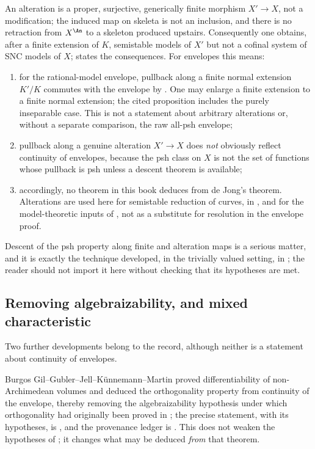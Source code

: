 An alteration is a proper, surjective, generically finite morphism
\(X'\to X\), not a modification; the induced map on skeleta is not an
inclusion, and there is no retraction from \(X^{\An}\) to a skeleton
produced upstairs.  Consequently one obtains, after a finite extension of
\(K\), semistable models of \(X'\) but not a cofinal system of SNC models of
\(X\);  states the consequences.  For envelopes
this means:
\begin{enumerate}
\item for the rational-model envelope, pullback along a finite normal
extension \(K'/K\) commutes with the envelope by
\cite[Proposition~2.11]{GJKM19}.  One may enlarge a finite extension to
a finite normal extension; the cited proposition includes the purely
inseparable case.  This is not a statement about arbitrary alterations or,
without a separate comparison, the raw all-psh envelope;
\item pullback along a genuine alteration \(X'\to X\) does \emph{not}
obviously reflect continuity of envelopes, because the psh class on \(X\) is
not the set of functions whose pullback is psh unless a descent theorem is
available;
\item accordingly, no theorem in this book deduces
 from de Jong's theorem.  Alterations are
used here for semistable reduction of curves, in
, and for the model-theoretic
inputs of , not as a substitute for resolution in the
envelope proof.
\end{enumerate}
Descent of the psh property along finite and alteration maps is a serious
matter, and it is exactly the technique developed, in the trivially valued
setting, in ; the reader should not import it here
without checking that its hypotheses are met.

\subsection{Removing algebraizability, and mixed characteristic}
\label{sec:ch23-later-algebraizability}

Two further developments belong to the record, although neither is a
statement about continuity of envelopes.

Burgos Gil--Gubler--Jell--K\"unnemann--Martin proved differentiability of
non-Archimedean volumes and deduced the orthogonality property from
continuity of the envelope, thereby removing the algebraizability
hypothesis under which orthogonality had originally been proved in
\cite{BFJ15}; the precise statement, with its hypotheses, is
, and the provenance ledger is
.  This does not weaken the hypotheses of
; it changes what may be deduced
\emph{from} that theorem.

